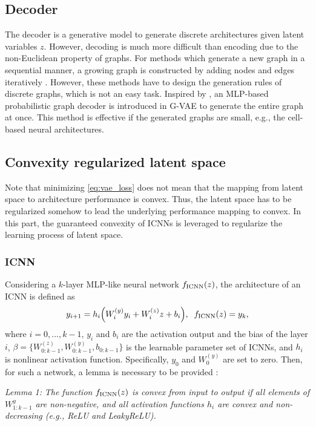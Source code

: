 \documentclass[10pt,twocolumn,letterpaper]{article}
\begin{document}
\subsection{Decoder} 
The decoder is a generative model to generate discrete architectures given latent variables $z$. However, decoding is much more difficult than encoding due to the non-Euclidean property of graphs. For methods which generate a new graph in a sequential manner, a growing graph is constructed by adding nodes and edges iteratively \cite{DBLP:conf/nips/ZhangJCGC19, you2018graphrnn}. However, these methods have to design the generation rules of discrete graphs, which is not an easy task. Inspired by \cite{simonovsky2018graphvae}, an MLP-based probabilistic graph decoder is introduced in G-VAE to generate the entire graph at once. This method is effective if the generated graphs are small, e.g., the cell-based neural architectures. 

\subsection{Convexity regularized latent space}
Note that minimizing \eqref{eq:vae_loss} does not mean that the mapping from latent space to architecture performance is convex. Thus, the latent space has to be regularized somehow to lead the underlying performance mapping to convex. In this part, the guaranteed convexity of ICNNs is leveraged to regularize the learning process of latent space. 	

\subsubsection{ICNN}
Considering a $k$-layer MLP-like neural network $f_{\rm ICNN}(z)$, the architecture of an ICNN is defined as
\begin{equation}
	y_{i+1} = h_{i}\Big( W_{i}^{(y)}y_{i} + W_{i}^{(z)}z + b_{i} \Big), \: \ f_{\rm ICNN}(z) = y_{k},
\end{equation} 
where $i=0,...,k-1$, $y_{i}$ and $b_{i}$ are the activation output and the bias of the layer $i$, $\beta = \{ W_{0:k-1}^{(z)}, W_{0:k-1}^{(y)}, b_{0:k-1} \}$ is the learnable parameter set of ICNNs, and $h_{i}$ is nonlinear activation function. Specifically, $y_{0}$ and $W_{0}^{(y)}$ are set to zero. Then, for such a network, a lemma is necessary to be provided \cite{amos2017input, chen2018optimal}:

\emph{Lemma 1:} \emph{The function $f_{\rm ICNN}(z)$ is convex from input to output if all elements of $W_{1:k-1}^{y}$ are non-negative, and all activation functions $h_{i}$ are convex and non-decreasing (e.g., ReLU and LeakyReLU).}
\end{document}
